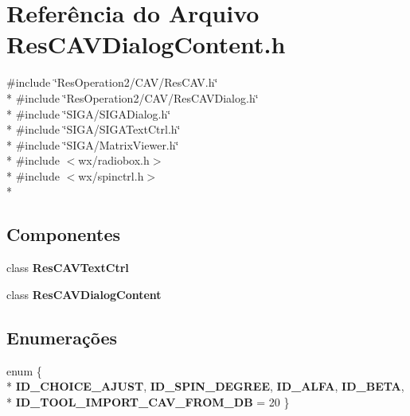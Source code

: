 \section{Referência do Arquivo Res\+C\+A\+V\+Dialog\+Content.\+h}
\label{_2_c_a_v_2_res_c_a_v_dialog_content_8h}
{\ttfamily \#include \char`\"{}Res\+Operation2/\+C\+A\+V/\+Res\+C\+A\+V.\+h\char`\"{}}\\*
{\ttfamily \#include \char`\"{}Res\+Operation2/\+C\+A\+V/\+Res\+C\+A\+V\+Dialog.\+h\char`\"{}}\\*
{\ttfamily \#include \char`\"{}S\+I\+G\+A/\+S\+I\+G\+A\+Dialog.\+h\char`\"{}}\\*
{\ttfamily \#include \char`\"{}S\+I\+G\+A/\+S\+I\+G\+A\+Text\+Ctrl.\+h\char`\"{}}\\*
{\ttfamily \#include \char`\"{}S\+I\+G\+A/\+Matrix\+Viewer.\+h\char`\"{}}\\*
{\ttfamily \#include $<$wx/radiobox.\+h$>$}\\*
{\ttfamily \#include $<$wx/spinctrl.\+h$>$}\\*
\subsection*{Componentes}
\begin{DoxyCompactItemize}
\item 
class {\bf Res\+C\+A\+V\+Text\+Ctrl}
\item 
class {\bf Res\+C\+A\+V\+Dialog\+Content}
\end{DoxyCompactItemize}
\subsection*{Enumerações}
\begin{DoxyCompactItemize}
\item 
enum \{ \\*
{\bf I\+D\+\_\+\+C\+H\+O\+I\+C\+E\+\_\+\+A\+J\+U\+ST}, 
{\bf I\+D\+\_\+\+S\+P\+I\+N\+\_\+\+D\+E\+G\+R\+EE}, 
{\bf I\+D\+\_\+\+A\+L\+FA}, 
{\bf I\+D\+\_\+\+B\+E\+TA}, 
\\*
{\bf I\+D\+\_\+\+T\+O\+O\+L\+\_\+\+I\+M\+P\+O\+R\+T\+\_\+\+C\+A\+V\+\_\+\+F\+R\+O\+M\+\_\+\+DB} = 20
 \}
\end{DoxyCompactItemize}
